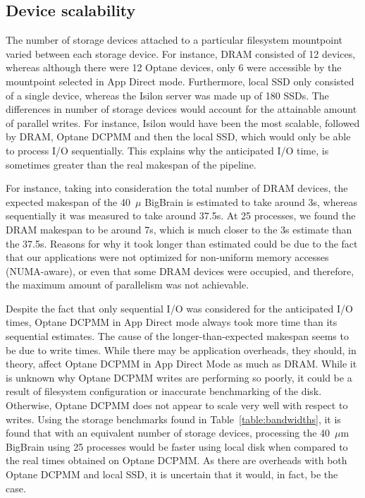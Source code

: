 \documentclass[conference]{IEEEtran}
\newcommand{\bigbrain}{BigBrain\xspace}
\begin{document}
\subsection{Device scalability}
The number of storage devices attached to a particular filesystem mountpoint varied between
each storage device. For instance, DRAM consisted of 12 devices, whereas although there were 
12 Optane devices, only 6 were accessible by the mountpoint selected in App Direct mode. Furthermore,
local SSD only consisted of a single device, whereas the Isilon server was made up of 180 SSDs. The differences
in number of storage devices would account for the attainable amount of parallel writes. For instance, 
Isilon would have been the most scalable, followed by DRAM, Optane DCPMM and then the local SSD, which would
only be able to process I/O sequentially. This explains why the anticipated I/O time, is sometimes greater
than the real makespan of the pipeline.

For instance, taking into consideration the total number of DRAM devices, the expected makespan of the
40~$\mu$ \bigbrain is estimated to take around 3s, whereas sequentially it was measured to take
around 37.5s. At 25 processes, we found the DRAM makespan to be around 7s, which is much closer to the 3s
estimate than the 37.5s. Reasons for why it took longer than estimated could be due to the fact that
our applications were not optimized for non-uniform memory accesses (NUMA-aware), or even that some DRAM devices were occupied, and therefore, the maximum amount of parallelism 
was not achievable. 

Despite the fact that only sequential I/O was considered for the anticipated I/O times, 
Optane DCPMM in App Direct mode always took more time than its sequential estimates. The cause
of the longer-than-expected makespan seems to be due to write times. While there may be application overheads,
they should, in theory, affect Optane DCPMM in App Direct Mode as much as DRAM. While it is unknown
why Optane DCPMM writes are performing so poorly, it could be a result of filesystem configuration or 
inaccurate benchmarking of the disk. Otherwise, Optane DCPMM does not appear to scale very well with respect to
writes. Using the storage benchmarks found in Table~\ref{table:bandwidths}, it is found that with an equivalent
number of storage devices, processing the 40~$\mu$m \bigbrain using 25 processes would be faster using
local disk when compared to the real times obtained on Optane DCPMM. As there are overheads with both Optane DCPMM and local
SSD, it is uncertain that it would, in fact, be the case.
\end{document}
